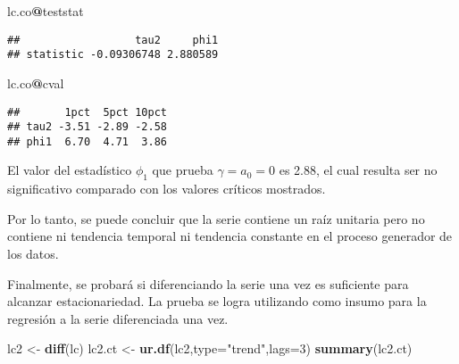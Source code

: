 \documentclass[]{book}
\newenvironment{Shaded}{\begin{snugshade}}{\end{snugshade}}
\newcommand{\KeywordTok}[1]{\textcolor[rgb]{0.13,0.29,0.53}{\textbf{#1}}}
\newcommand{\DataTypeTok}[1]{\textcolor[rgb]{0.13,0.29,0.53}{#1}}
\newcommand{\DecValTok}[1]{\textcolor[rgb]{0.00,0.00,0.81}{#1}}
\newcommand{\StringTok}[1]{\textcolor[rgb]{0.31,0.60,0.02}{#1}}
\newcommand{\OperatorTok}[1]{\textcolor[rgb]{0.81,0.36,0.00}{\textbf{#1}}}
\newcommand{\NormalTok}[1]{#1}
\theoremstyle{definition}
\theoremstyle{definition}
\theoremstyle{definition}
\theoremstyle{remark}
\begin{document}
\begin{Shaded}
\begin{Highlighting}[]
\NormalTok{lc.co}\OperatorTok{@}\NormalTok{teststat}
\end{Highlighting}
\end{Shaded}

\begin{verbatim}
##                  tau2     phi1
## statistic -0.09306748 2.880589
\end{verbatim}

\begin{Shaded}
\begin{Highlighting}[]
\NormalTok{lc.co}\OperatorTok{@}\NormalTok{cval}
\end{Highlighting}
\end{Shaded}

\begin{verbatim}
##       1pct  5pct 10pct
## tau2 -3.51 -2.89 -2.58
## phi1  6.70  4.71  3.86
\end{verbatim}

El valor del estadístico \(\phi_1\) que prueba \(\gamma=a_0=0\) es 2.88,
el cual resulta ser no significativo comparado con los valores críticos
mostrados.

Por lo tanto, se puede concluir que la serie contiene un raíz unitaria
pero no contiene ni tendencia temporal ni tendencia constante en el
proceso generador de los datos.

Finalmente, se probará si diferenciando la serie una vez es suficiente
para alcanzar estacionariedad. La prueba se logra utilizando como insumo
para la regresión a la serie diferenciada una vez.

\begin{Shaded}
\begin{Highlighting}[]
\NormalTok{lc2 <-}\StringTok{ }\KeywordTok{diff}\NormalTok{(lc)}
\NormalTok{lc2.ct <-}\StringTok{ }\KeywordTok{ur.df}\NormalTok{(lc2,}\DataTypeTok{type=}\StringTok{"trend"}\NormalTok{,}\DataTypeTok{lags=}\DecValTok{3}\NormalTok{)}
\KeywordTok{summary}\NormalTok{(lc2.ct)}
\end{Highlighting}
\end{Shaded}
\end{document}
